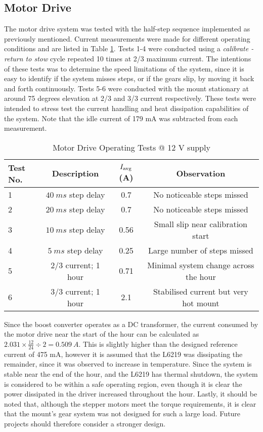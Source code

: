 \subsection{Motor Drive}
The motor drive system was tested with the half-step sequence implemented as previously mentioned. Current measurements were made for different operating conditions and are listed in Table \ref{tab:motorDriveTests}. Tests 1-4 were conducted using a \textit{calibrate - return to stow} cycle repeated 10 times at 2/3 maximum current. The intentions of these tests was to determine the speed limitations of the system, since it is easy to identify if the system misses steps, or if the gears slip, by moving it back and forth continuously. Tests 5-6 were conducted with the mount stationary at around 75 degrees elevation at 2/3 and 3/3 current respectively. These tests were intended to stress test the current handling and heat dissipation capabilities of the system. Note that the idle current of 179 mA was subtracted from each measurement.

\begin{table}[!htb]
  \centering
  \renewcommand{\arraystretch}{1.2}
  \begin{tabular}{ |p{0.8cm}|c|c|c| }
  \hline
  \textbf{Test No.}  & \textbf{Description} & \textbf{$I_{\textnormal{avg}}$ (A)} & Observation \\
  \hline
  1
  & $\SI{40}{ms}$ step delay           
  & 0.7
  & No noticeable steps missed
  \\  \hline
  2
  & $\SI{20}{ms}$ step delay           
  & 0.7
  & No noticeable steps missed
  \\  \hline
  3
  & $\SI{10}{ms}$ step delay           
  & 0.56
  & Small slip near calibration start
  \\  \hline
  4
  & $\SI{5}{ms}$ step delay           
  & 0.25
  & Large number of steps missed
  \\  \hline
  5
  & 2/3 current; 1 hour
  & 0.71
  & Minimal system change across the hour
  \\  \hline
  6
  & 3/3 current; 1 hour
  & 2.1
  & Stabilised current but very hot mount
  \\  \hline
  \end{tabular}
  \caption{Motor Drive Operating Tests @ 12 V supply}
  \label{tab:motorDriveTests}
\end{table}

Since the boost converter operates as a DC transformer, the current consumed by the motor drive near the start of the hour can be calculated as $2.031 \times \frac{12}{24} \div 2 = \SI{0.509}{A}$. This is slightly higher than the designed reference current of 475 mA, however it is assumed that the L6219 was dissipating the remainder, since it was observed to increase in temperature. Since the system is stable near the end of the hour, and the L6219 has thermal shutdown, the system is considered to be within a safe operating region, even though it is clear the power dissipated in the driver increased throughout the hour. Lastly, it should be noted that, although the stepper motors meet the torque requirements, it is clear that the mount's gear system was not designed for such a large load. Future projects should therefore consider a stronger design.